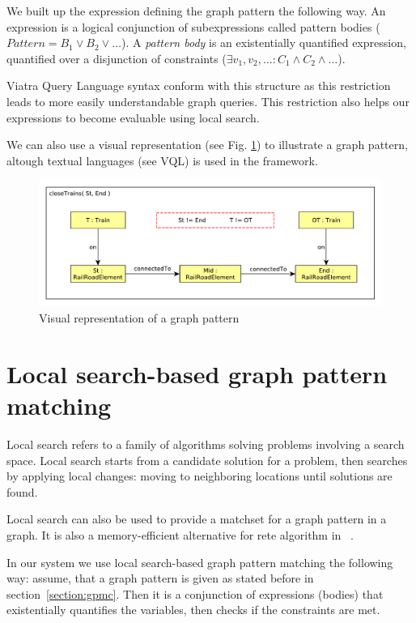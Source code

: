 We built up the expression defining the graph pattern the following way. 
An expression is a logical conjunction of subexpressions called pattern bodies ($Pattern = B_1 \vee B_2 \vee \dots$). 
A \emph{pattern body} is an existentially quantified expression, quantified over a disjunction of constraints ($\exists{} v_1, v_2, \dots : C_1 \wedge{} C_2 \wedge \dots$).

Viatra Query Language syntax conform with this structure as this restriction leads to more easily understandable graph queries.
This restriction also helps our expressions to become evaluable using local search.

We can also use a visual representation (see Fig. \ref{fig:pattern-visual}) to illustrate a graph pattern, altough textual languages (see VQL) is used in the framework.

\begin{figure}[h]
	\begin{center}
		\includegraphics[width=\textwidth]{figures/closeTrains-pattern.pdf}
		\caption{Visual representation of a graph pattern}
		\label{fig:pattern-visual}
	\end{center}
\end{figure}


\section{Local search-based graph pattern matching}


Local search refers to a family of algorithms solving problems involving a search space. 
Local search starts from a candidate solution for a problem, then searches by applying local changes: moving to neighboring locations until solutions are found.

Local search can also be used to provide a matchset for a graph pattern in a graph.
It is also a memory-efficient alternative for rete algorithm in \viatra{}~\cite{bur-marton-msc}.

In our system we use local search-based graph pattern matching the following way:
assume, that a graph pattern is given as stated before in section~\ref{section:gpmc}.
Then it is a conjunction of expressions (bodies) that existentially quantifies the variables, then checks if the constraints are met.


